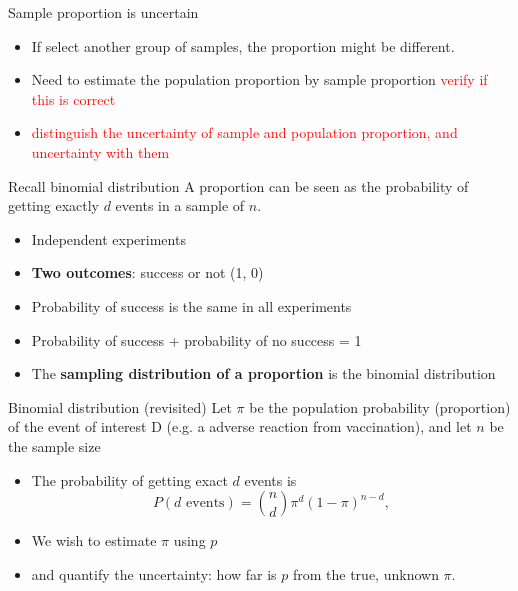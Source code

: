 \documentclass[compress, notes=hide]{beamer}
\newcommand{\hl}[1]{\textbf{#1}}
\begin{document}
\begin{frame}
	\begin{block}{Sample proportion is uncertain}
		\begin{itemize}
			\item If select another group of samples, the proportion might be different. 
			\item Need to estimate the population proportion by sample proportion \textcolor{red}{verify if this is correct}
			\item \textcolor{red}{distinguish the uncertainty of sample and population proportion, and uncertainty with them}
		\end{itemize}	
		
	\end{block}	
	
	\begin{block}{Recall binomial distribution}
		A proportion can be seen as the probability of getting exactly $d$ events in a sample of $n$.
		
		\begin{itemize}
			\item Independent experiments
			\item \hl{Two outcomes}: success or not (1, 0)
			\item Probability of success is the same in all experiments
			\item Probability of success + probability of no success = 1
			\item The \hl{sampling distribution of a proportion} is the binomial distribution
		\end{itemize}
	\end{block}
\end{frame}




\begin{frame}
	\begin{block}{Binomial distribution (revisited)}
		Let $\pi$ be the population probability (proportion) of the event of interest D (e.g. a adverse reaction from vaccination), and let $n$ be the sample size
		
		\begin{itemize}
			\item The probability of getting exact $d$ events is 
			\begin{equation}
				P(\text{$d$ events}) = \binom{n}{d}  \pi^d  (1 - \pi)^{n-d},\nonumber
			\end{equation}
			
			\item We wish to estimate $\pi$ using $p$
			\item and quantify the uncertainty: how far is $p$ from the true, unknown $\pi$.
		\end{itemize}
	\end{block}
\end{frame}
\end{document}
